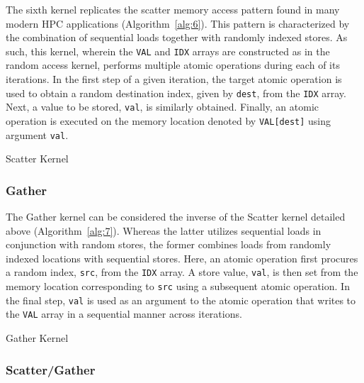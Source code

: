 The sixth kernel replicates the scatter memory access pattern found in many modern HPC applications (Algorithm~\ref{alg:6}).
This pattern is characterized by the combination of sequential loads together with randomly indexed stores.
As such, this kernel, wherein the \texttt{VAL} and \texttt{IDX} arrays are constructed as in the random access kernel, performs multiple atomic operations during each of its iterations.
In the first step of a given iteration, the target atomic operation is used to obtain a random destination index, given by \texttt{dest}, from the \texttt{IDX} array.
Next, a value to be stored, \texttt{val}, is similarly obtained.
Finally, an atomic operation is executed on the memory location denoted by \texttt{VAL[dest]} using argument \texttt{val}.

\begin{algorithm}
\SetAlgoLined
{}
\caption{Scatter Kernel}
\label{alg:6}
\end{algorithm}

\subsubsection{Gather}
\label{subsubsec:gather}

The Gather kernel can be considered the inverse of the Scatter kernel detailed above (Algorithm~\ref{alg:7}).
Whereas the latter utilizes sequential loads in conjunction with random stores, the former combines loads from randomly indexed locations with sequential stores.
Here, an atomic operation first procures a random index, \texttt{src}, from the \texttt{IDX} array.
A store value, \texttt{val}, is then set from the memory location corresponding to \texttt{src} using a subsequent atomic operation.
In the final step, \texttt{val} is used as an argument to the atomic operation that writes to the \texttt{VAL} array in a sequential manner across iterations. 

\begin{algorithm}
\SetAlgoLined
{}
\caption{Gather Kernel}
\label{alg:7}
\end{algorithm}

\subsubsection{Scatter/Gather}
\label{subsubsec:sg}

